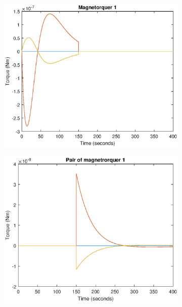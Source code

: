 \begin{figure}[H]
	\begin{subfigure}{0.5\linewidth}
		\centering
		\includegraphics[width=1\linewidth]{figures/config1.eps}
		\label{fig:magcompens}
	\end{subfigure}
	\begin{subfigure}{0.5\linewidth}
		\centering
		\includegraphics[width=1\linewidth]{figures/config11.eps}
		\label{fig:fig:magcompens2}	
	\end{subfigure}
\begin{subfigure}{0.5\linewidth}

\end{subfigure}
\end{figure}
